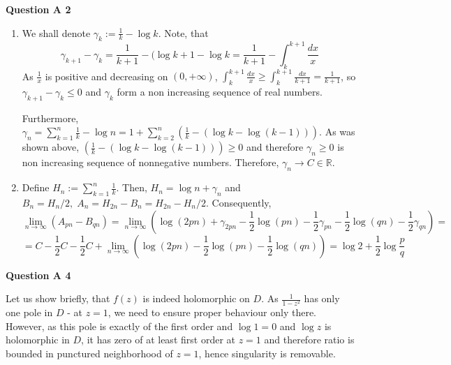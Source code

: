 \documentclass[8pt]{article} %
\newcommand{\questionA}[1]{\noindent\textbf{Question A #1}\par}
\let\oldlim\lim
\renewcommand{\lim}{\displaystyle\oldlim}
\begin{document}
\questionA{2}
\begin{enumerate}[label=(\arabic*)]
\item{We shall denote $\gamma_k:=\frac{1}{k}-\log k$. Note, that
\[\gamma_{k+1}-\gamma_k=\frac{1}{k+1}-(\log{k+1}-\log {k}=\frac{1}{k+1}-\int_k^{k+1}\frac{dx}{x}\]
As $\frac{1}{x}$ is positive and decreasing on $(0,+\infty)$, $\int_k^{k+1}\frac{dx}{x}\geq \int_k^{k+1}\frac{dx}{k+1}=\frac{1}{k+1}$, so
$\gamma_{k+1}-\gamma_k\leq 0$ and $\gamma_k$ form a non increasing sequence of real numbers.

Furthermore, $\gamma_n=\sum_{k=1}^n\frac{1}{k}
-\log n=1+\sum_{k=2}^n(\frac{1}{k}-(\log k-\log (k-1)))$. As was shown above, $(\frac{1}{k}-(\log k-\log (k-1)))
\geq 0$ and therefore $\gamma_n\geq 0$ is non increasing sequence of nonnegative numbers. Therefore, $\gamma_n\to C\in\mathbb{R}$.
}
\item{Define $H_n:=\sum_{k=1}^n\frac{1}{k}$. Then, $H_n=\log n+\gamma_n$ and
$B_n=H_n/2,\;A_n=H_{2n}-B_n=H_{2n}-H_n/2$. Consequently,
\[\lim_{n\to\infty}(A_{pn}-B_{qn})=\lim_{n\to\infty}(\log(2pn)+\gamma_{2pn}-\frac{1}{2}\log (pn)-\frac{1}{2}\gamma_{pn}
-\frac{1}{2}\log(qn)-\frac{1}{2}\gamma_{qn})=\]
\[=C-\frac{1}{2}C-\frac{1}{2}C+\lim_{n\to\infty}(\log(2pn)-\frac{1}{2}\log(pn)-\frac{1}{2}\log(qn))=\log 2+\frac{1}{2}\log\frac{p}{q}\]
}
\end{enumerate}
\questionA{4}
Let us show briefly, that $f(z)$ is indeed holomorphic on $D$. As $\frac{1}{1-z^2}$ has only one pole in $D$ - at $z=1$, we need to ensure
proper behaviour only there. However, as this pole is exactly of the first order and $\log 1=0$ and $\log z$ is holomorphic in $D$, it has 
zero of at least first order at $z=1$ and therefore ratio is bounded in punctured neighborhood of $z=1$, hence singularity is removable.
\end{document}

